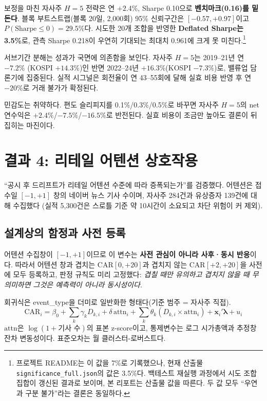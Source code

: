 \documentclass[11pt,a4paper]{article}
\newcommand{\sig}[1]{\textbf{#1}}
\begin{document}
보정을 마친 자사주 $H=5$ 전략은 연 $+2.4\%$, Sharpe 0.10으로 \sig{벤치마크(0.16)를 밑돈다}.
블록 부트스트랩(블록 20일, 2{,}000회) 95\% 신뢰구간은 $[-0.57, +0.97]$이고 $P(\text{Sharpe} \le 0) = 29.5\%$다.
시도한 20개 조합을 반영한 \sig{Deflated Sharpe는 3.5\%}로, 관측 Sharpe 0.218이 우연히 기대되는
최대치 0.961에 크게 못 미친다.\footnote{프로젝트 README는 이 값을 7\%로 기록했으나, 현재
산출물 \texttt{significance\_full.json}의 값은 3.5\%다. 백테스트 재실행 과정에서 시도 조합
집합이 갱신된 결과로 보이며, 본 리포트는 산출물 값을 따른다. 두 값 모두 ``우연과 구분 불가''라는
결론은 동일하다.}

서브기간 분해는 성과가 국면에 의존함을 보인다. 자사주 $H=5$는 2019--21년 연 $-7.2\%$
(KOSPI $+14.3\%$)인 반면 2022--24년 $+16.3\%$(KOSPI $-7.3\%$)로, 밸류업 담론기에 집중된다.
실적 시그널은 회전율이 연 43--55회에 달해 실효 비용 반영 후 연 $-20\%$로 거래 불가가 확정된다.

민감도는 취약하다. 편도 슬리피지를 0.1\%/0.3\%/0.5\%로 바꾸면 자사주 $H=5$의 net 연수익은
$+2.4\%$/$-7.5\%$/$-16.5\%$로 반전된다. 실효 비용이 조금만 높아도 결론이 뒤집히는 마진이다.

\section{결과 4: 리테일 어텐션 상호작용}

``공시 후 드리프트가 리테일 어텐션 수준에 따라 증폭되는가''를 검증했다. 어텐션은 접수일
$[-1,+1]$ 창의 네이버 뉴스 기사 수이며, 자사주 284건과 유상증자 139건에 대해 수집했다
(실적 5{,}300건은 스로틀 기준 약 10시간이 소요되고 차단 위험이 커 제외).

\subsection{설계상의 함정과 사전 등록}
어텐션 수집창이 $[-1,+1]$이므로 이 변수는 \sig{사전 관심이 아니라 사후·동시 반응}이다.
따라서 어텐션 창과 겹치는 $\mathrm{CAR}[0,+20]$과 겹치지 않는 $\mathrm{CAR}[+2,+20]$을
사전에 모두 등록하고, 판정 규칙도 미리 고정했다: \emph{겹칠 때만 유의하고 겹치지 않을 때
무의미하면 그것은 예측력이 아니라 동시성이다.}

회귀식은 event\_type을 더미로 일반화한 형태다(기준 범주 = 자사주 직접).
\[
\mathrm{CAR}_i = \beta_0 + \sum_k \gamma_k D_{k,i} + \delta\,\mathrm{attn}_i
+ \sum_k \theta_k (D_{k,i} \times \mathrm{attn}_i) + \mathbf{x}_i'\boldsymbol{\lambda} + u_i
\]
$\mathrm{attn}$은 $\log(1+\text{기사 수})$의 표본 z-score이고, 통제변수는 로그 시가총액과
추정창 잔차 변동성이다. 표준오차는 월 클러스터-로버스트다.
\end{document}
